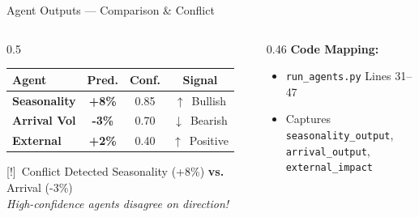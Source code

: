 \documentclass[aspectratio=169]{beamer}
\newcommand{\faArrowUp}{$\uparrow$}
\newcommand{\faArrowDown}{$\downarrow$}
\newcommand{\faExclamationTriangle}{[!]}
\begin{document}
\begin{frame}{Agent Outputs — Comparison \& Conflict}
\vspace{0.1cm}
\begin{columns}[T]
  \begin{column}{0.5\textwidth}
    \centering
    \renewcommand{\arraystretch}{1.4}
    \begin{tabular}{|>{\bfseries}l|c|c|c|}
      \hline
      \rowcolor{MandiGreen!80}
      \color{white}Agent &
      \color{white}Pred. &
      \color{white}Conf. &
      \color{white}Signal \\
      \hline
      \rowcolor{LightGreen}
      Seasonality & \textcolor{MandiGreen}{\textbf{+8\%}} & 0.85 &
        \textcolor{MandiGreen}{\faArrowUp\ Bullish} \\
      \hline
      \rowcolor{LightBlue}
      Arrival Vol & \textcolor{AgentRed}{\textbf{-3\%}} & 0.70 &
        \textcolor{AgentRed}{\faArrowDown\ Bearish} \\
      \hline
      \rowcolor{LightPurple}
      External & \textcolor{AgentPurple}{\textbf{+2\%}} & 0.40 &
        \textcolor{AgentPurple}{\faArrowUp\ Positive} \\
      \hline
    \end{tabular}

    \vspace{0.3cm}
    \begin{alertblock}{\faExclamationTriangle\ Conflict Detected}
      Seasonality (+8\%) \textbf{vs.} Arrival (-3\%)\\
      \textit{High-confidence agents disagree on direction!}
    \end{alertblock}
  \end{column}
  \begin{column}{0.46\textwidth}
    \textbf{Code Mapping:}
    \begin{itemize}
      \item \texttt{run\_agents.py} Lines 31–47
      \item Captures \texttt{seasonality\_output},\\
            \texttt{arrival\_output},\\
            \texttt{external\_impact}
    \end{itemize}
    \vspace{0.4cm}
    \centering
\end{column}
\end{columns}
\end{frame}
\end{document}
